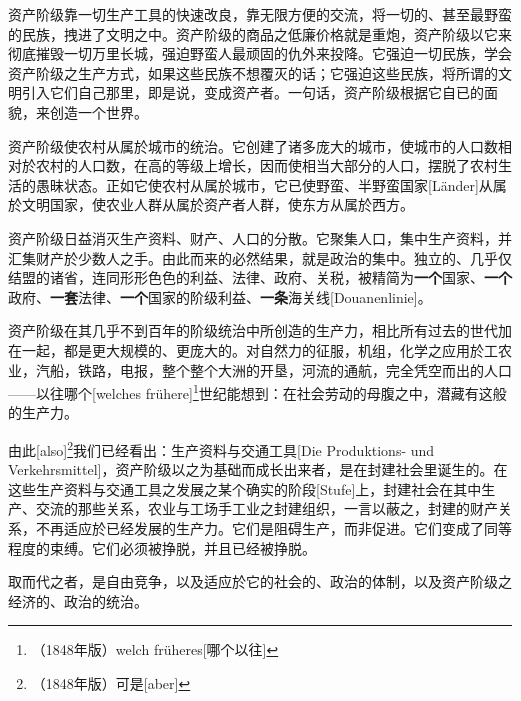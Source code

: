 \documentclass[a4paper,12pt]{ctexart}
\begin{document}
资产阶级靠一切生产工具的快速改良，靠无限方便的交流，将一切的、甚至最野蛮的民族，拽进了文明之中。资产阶级的商品之低廉价格就是重炮，资产阶级以它来彻底摧毁一切万里长城，强迫野蛮人最顽固的仇外来投降。它强迫一切民族，学会资产阶级之生产方式，如果这些民族不想覆灭的话；它强迫这些民族，将所谓的文明引入它们自己那里，即是说，变成资产者。一句话，资产阶级根据它自已的面貌，来创造一个世界。

资产阶级使农村从属於城市的统治。它创建了诸多庞大的城市，使城市的人口数相对於农村的人口数，在高的等级上增长，因而使相当大部分的人口，摆脱了农村生活的愚昧状态。正如它使农村从属於城市，它已使野蛮、半野蛮国家[Länder]从属於文明国家，使农业人群从属於资产者人群，使东方从属於西方。


资产阶级日益消灭生产资料、财产、人口的分散。它聚集人口，集中生产资料，并汇集财产於少数人之手。由此而来的必然结果，就是政治的集中。独立的、几乎仅结盟的诸省，连同形形色色的利益、法律、政府、关税，被精简为\textbf{一个}国家、\textbf{一个}政府、\textbf{一套}法律、\textbf{一个}国家的阶级利益、\textbf{一条}海关线[Douanenlinie]。

资产阶级在其几乎不到百年的阶级统治中所创造的生产力，相比所有过去的世代加在一起，都是更大规模的、更庞大的。对自然力的征服，机组，化学之应用於工农业，汽船，铁路，电报，整个整个大洲的开垦，河流的通航，完全凭空而出的人口——以往哪个[welches frühere]\footnote{（1848年版）welch früheres[哪个以往]}世纪能想到：在社会劳动的母腹之中，潜藏有这般的生产力。

由此[also]\footnote{（1848年版）可是[aber]}我们已经看出：生产资料与交通工具[Die Produktions- und Verkehrsmittel]，资产阶级以之为基础而成长出来者，是在封建社会里诞生的。在这些生产资料与交通工具之发展之某个确实的阶段[Stufe]上，封建社会在其中生产、交流的那些关系，农业与工场手工业之封建组织，一言以蔽之，封建的财产关系，不再适应於已经发展的生产力。它们是阻碍生产，而非促进。它们变成了同等程度的束缚。它们必须被挣脱，并且已经被挣脱。

取而代之者，是自由竞争，以及适应於它的社会的、政治的体制，以及资产阶级之经济的、政治的统治。

\end{document}
